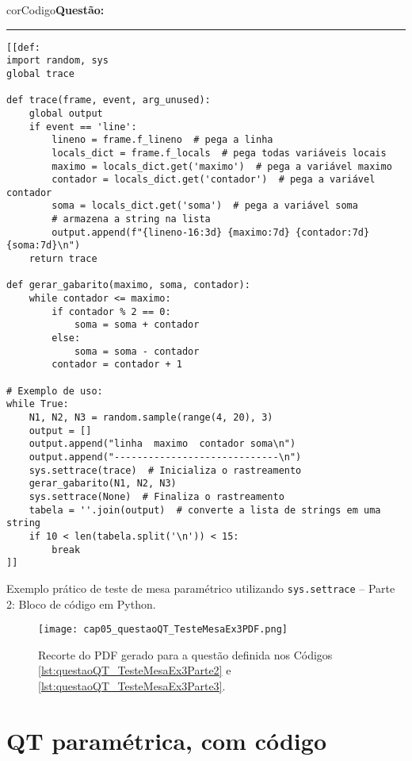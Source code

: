 \begin{listing}[!ht]
\begin{myboxCode}{corCodigo}{\textbf{Questão: }}\vspace{3mm}
\hrule
\begin{verbatim}
[[def:
import random, sys
global trace

def trace(frame, event, arg_unused):
    global output
    if event == 'line':
        lineno = frame.f_lineno  # pega a linha
        locals_dict = frame.f_locals  # pega todas variáveis locais
        maximo = locals_dict.get('maximo')  # pega a variável maximo
        contador = locals_dict.get('contador')  # pega a variável contador
        soma = locals_dict.get('soma')  # pega a variável soma
        # armazena a string na lista
        output.append(f"{lineno-16:3d} {maximo:7d} {contador:7d} {soma:7d}\n")  
    return trace

def gerar_gabarito(maximo, soma, contador):
    while contador <= maximo:
        if contador % 2 == 0:
            soma = soma + contador
        else:
            soma = soma - contador
        contador = contador + 1

# Exemplo de uso:
while True:
    N1, N2, N3 = random.sample(range(4, 20), 3)
    output = []
    output.append("linha  maximo  contador soma\n")
    output.append("-----------------------------\n")
    sys.settrace(trace)  # Inicializa o rastreamento
    gerar_gabarito(N1, N2, N3)
    sys.settrace(None)  # Finaliza o rastreamento
    tabela = ''.join(output)  # converte a lista de strings em uma string
    if 10 < len(tabela.split('\n')) < 15:
        break
]]
\end{verbatim}
\end{myboxCode}
\caption{Exemplo prático de teste de mesa paramétrico utilizando \texttt{sys.settrace} -- Parte 2: Bloco de código em Python.}
\label{lst:questaoQT_TesteMesaEx3Parte3}
\end{listing}

\begin{figure}[!ht]
  \texttt{[image: cap05\_questaoQT\_TesteMesaEx3PDF.png]}
  \caption{Recorte do PDF gerado para a questão definida nos Códigos \ref{lst:questaoQT_TesteMesaEx3Parte2} e \ref{lst:questaoQT_TesteMesaEx3Parte3}.}
  \label{fig:cap05_questaoQT_TesteMesaEx3PDF}
\end{figure}

\section{QT paramétrica, com código}\label{sec:questoesQT_VPL}

